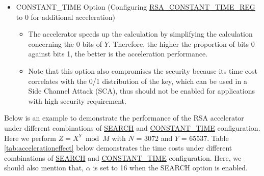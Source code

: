 \documentclass[main\_\_EN.tex]{subfiles}
\begin{document}
\begin{itemize}
\item CONSTANT\_TIME Option (Configuring \hyperref[regdesc:RSACONSTANTTIMEREG]{RSA\_CONSTANT\_TIME\_REG} to 0 for additional acceleration)
    \begin{itemize}
        \item The accelerator speeds up the calculation by simplifying the calculation concerning the 0 bits of \begin{math} Y \end{math}. Therefore, the higher the proportion of bits 0 against bits 1, the better is the acceleration performance.
        \item Note that this option also compromises the security because its time cost correlates with the 0/1 distribution of the key, which can be used in a Side Channel Attack (SCA), thus should not be enabled for applications with high security requirement.
    \end{itemize} 
\end{itemize}

Below is an example to demonstrate the performance of the RSA accelerator under different combinations of \hyperref[regdesc:RSASEARCHENABLEREG]{SEARCH} and \hyperref[regdesc:RSACONSTANTTIMEREG]{CONSTANT\_TIME} configuration. Here we perform \begin{math}Z = X^{Y} \bmod M\end{math} with \begin{math}N\end{math} = 3072 and \begin{math}Y\end{math} = 65537. Table \ref{tab:accelerationeffect} below demonstrates the time costs under different combinations of \hyperref[regdesc:RSASEARCHENABLEREG]{SEARCH} and \hyperref[regdesc:RSACONSTANTTIMEREG]{CONSTANT\_TIME} configuration. Here, we should also mention that, \begin{math} \alpha \end{math} is set to 16 when the SEARCH option is enabled.
\end{document}
